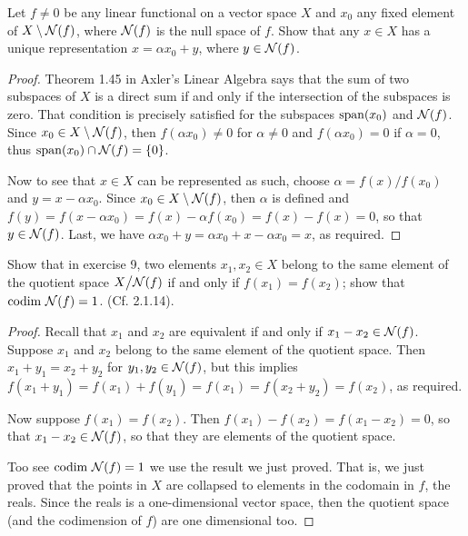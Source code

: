 \begin{exercise}{9}
Let $f\neq 0$ be any linear functional on a vector space $X$ and $x_0$ any fixed element of $X\setminus \mathcal{N}(f)$, where $\mathcal{N}(f)$ is the null space of $f$.
Show that any $x\in X$ has a unique representation $x=\alpha x_0+y$, where $y\in\mathcal{N}(f)$.
\end{exercise}
\begin{proof}
Theorem 1.45 in Axler's Linear Algebra says that the sum of two subspaces of $X$ is a direct sum if and only if the intersection of the subspaces is zero.
That condition is precisely satisfied for the subspaces $\operatorname*{span}(x_0)$ and $\mathcal{N}(f)$.
Since $x_0\in X\setminus\mathcal{N}(f)$, then $f(\alpha x_0)\neq 0$ for $\alpha\neq 0$ and $f(\alpha x_0)=0$ if $\alpha=0$, thus $\operatorname*{span}(x_0)\cap \mathcal{N}(f)=\{0\}$.

Now to see that $x\in X$ can be represented as such, choose $\alpha = f(x)/f(x_0)$ and $y=x-\alpha x_0$.
Since $x_0\in X\setminus\mathcal{N}(f)$, then $\alpha$ is defined and $f(y) =f(x-\alpha x_0) =f(x)-\alpha f(x_0) =f(x)-f(x)=0$, so that $y\in\mathcal{N}(f)$.
Last, we have $\alpha x_0+y =\alpha x_0 +x-\alpha x_0=x$, as required.
\end{proof}

\begin{exercise}{10}
Show that in exercise 9, two elements $x_1,x_2\in X$ belong to the same element of the quotient space ${\textstyle X}\big/{\textstyle \mathcal{N}(f)}$ if and only if $f(x_1)=f(x_2)$;
show that $\text{codim }\mathcal{N}(f)=1$.
(Cf. 2.1.14).
\end{exercise}
\begin{proof}
Recall that $x_1$ and $x_2$ are equivalent if and only if $x_1-x_2\in\mathcal{N}(f)$.
Suppose $x_1$ and $x_2$ belong to the same element of the quotient space.
Then $x_1+y_1=x_2+y_2$ for $y_1,y_2\in\mathcal{N}(f)$, but this implies $f(x_1+y_1) =f(x_1)+f(y_1) =f(x_1) =f(x_2+y_2) =f(x_2)$, as required.

Now suppose $f(x_1)=f(x_2)$.
Then $f(x_1)-f(x_2) =f(x_1-x_2) =0$, so that $x_1-x_2\in\mathcal{N}(f)$, so that they are elements of the quotient space.

Too see $\text{codim }\mathcal{N}(f)=1$ we use the result we just proved.
That is, we just proved that the points in $X$ are collapsed to elements in the codomain in $f$, the reals.
Since the reals is a one-dimensional vector space, then the quotient space (and the codimension of $f$) are one dimensional too.
\end{proof}


